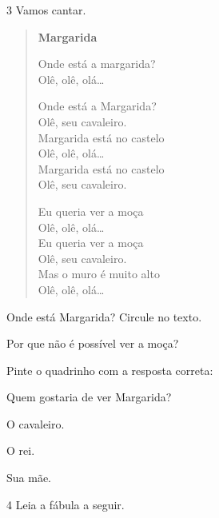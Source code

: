 \num{3} Vamos cantar.


\begin{verse}
\textbf{Margarida}

Onde está a margarida?\\
Olê, olê, olá…

Onde está a Margarida?\\
Olê, seu cavaleiro.\\
Margarida está no castelo\\
Olê, olê, olá…\\
Margarida está no castelo\\
Olê, seu cavaleiro.

Eu queria ver a moça\\
Olê, olê, olá…\\
Eu queria ver a moça\\
Olê, seu cavaleiro.\\
Mas o muro é muito alto\\
Olê, olê, olá…
\end{verse}


\begin{escolha}
\item Onde está Margarida? Circule no texto.

\item Por que não é possível ver a moça?


\item Pinte o quadrinho com a resposta correta:

Quem gostaria de ver Margarida?

\begin{boxlist}
 O cavaleiro.

 O rei.

 Sua mãe.
\end{boxlist}

\end{escolha}

\num{4} Leia a fábula a seguir.


